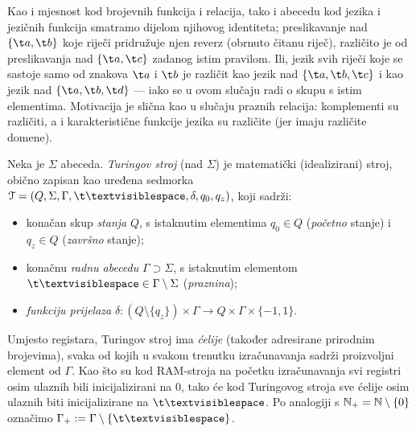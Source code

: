 \begin{napomena}[{name=[abeceda je dio identiteta jezične funkcije]}]
Kao i mjesnost kod brojevnih funkcija i relacija, tako i abecedu kod jezika i jezičnih funkcija smatramo dijelom njihovog identiteta; preslikavanje nad $\{\t a,\t b\}$ koje riječi pridružuje njen reverz (obrnuto čitanu riječ), različito je od preslikavanja nad $\{\t a,\t c\}$ zadanog istim pravilom. Ili, jezik svih riječi koje se sastoje samo od znakova $\t a$ i $\t b$ je različit kao jezik nad $\{\t a,\t b,\t c\}$ i kao jezik nad $\{\t a,\t b,\t d\}$ --- iako se u ovom slučaju radi o skupu s istim elementima. Motivacija je slična kao u slučaju praznih relacija: komplementi su različiti, a i karakteristične funkcije jezika su različite (jer imaju različite domene).
\end{napomena}

\begin{definicija}[{name=[Turingov stroj]}]
Neka je $\Sigma$ abeceda. \emph{Turingov stroj} (nad $\Sigma$) je matematički (idealizirani) stroj, obično zapisan kao uređena sedmorka $\mathcal T=(Q,\Sigma,\Gamma,\bl,\delta,q_0,q_z)$, koji sadrži:
\begin{itemize}
    \item konačan skup \emph{stanja} $Q$, s istaknutim elementima $q_0\in Q$ (\emph{početno} stanje) i $q_z\in Q$ (\emph{završno} stanje);
    \item konačnu \emph{radnu abecedu} $\Gamma\supset\Sigma$, s istaknutim elementom $\bl\in\Gamma\setminus\Sigma$ (\emph{praznina});
    \item \emph{funkciju prijelaza} $\delta:(Q\setminus\{q_z\})\times\Gamma\to Q\times\Gamma\times\{-1,1\}$.\qedhere
\end{itemize}
\end{definicija}

Umjesto registara, Turingov stroj ima \emph{ćelije} (također adresirane prirodnim brojevima), svaka od kojih u svakom trenutku izračunavanja sadrži proizvoljni element od $\Gamma$. Kao što su kod RAM-stroja na početku izračunavanja svi registri osim ulaznih bili inicijalizirani na $0$, tako će kod Turingovog stroja sve ćelije osim ulaznih biti inicijalizirane na $\bl$. Po analogiji s ${\mathbb N}_+={\mathbb N}\setminus\{0\}$ označimo $\Gamma_+:=\Gamma\setminus\{\bl\}$.

